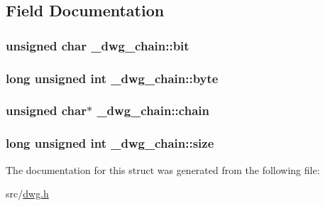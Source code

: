 \subsection{\-Field \-Documentation}
\hypertarget{struct__dwg__chain_ac42af759d64497542076d7c08bb3da1c}{
\subsubsection[{bit}]{\setlength{\rightskip}{0pt plus 5cm}unsigned char {\bf \-\_\-dwg\-\_\-chain\-::bit}}}\label{struct__dwg__chain_ac42af759d64497542076d7c08bb3da1c}
\hypertarget{struct__dwg__chain_a0017d0a80fcf01967cc0e3afd75c2348}{
\subsubsection[{byte}]{\setlength{\rightskip}{0pt plus 5cm}long unsigned int {\bf \-\_\-dwg\-\_\-chain\-::byte}}}\label{struct__dwg__chain_a0017d0a80fcf01967cc0e3afd75c2348}
\hypertarget{struct__dwg__chain_a83b23420da491f8e12cf6f635aa38a23}{
\subsubsection[{chain}]{\setlength{\rightskip}{0pt plus 5cm}unsigned char$\ast$ {\bf \-\_\-dwg\-\_\-chain\-::chain}}}\label{struct__dwg__chain_a83b23420da491f8e12cf6f635aa38a23}
\hypertarget{struct__dwg__chain_a83e91244124cb475f4ac9eee082d7462}{
\subsubsection[{size}]{\setlength{\rightskip}{0pt plus 5cm}long unsigned int {\bf \-\_\-dwg\-\_\-chain\-::size}}}\label{struct__dwg__chain_a83e91244124cb475f4ac9eee082d7462}


\-The documentation for this struct was generated from the following file\-:\begin{DoxyCompactItemize}
\item 
src/\hyperlink{dwg_8h}{dwg.\-h}\end{DoxyCompactItemize}

